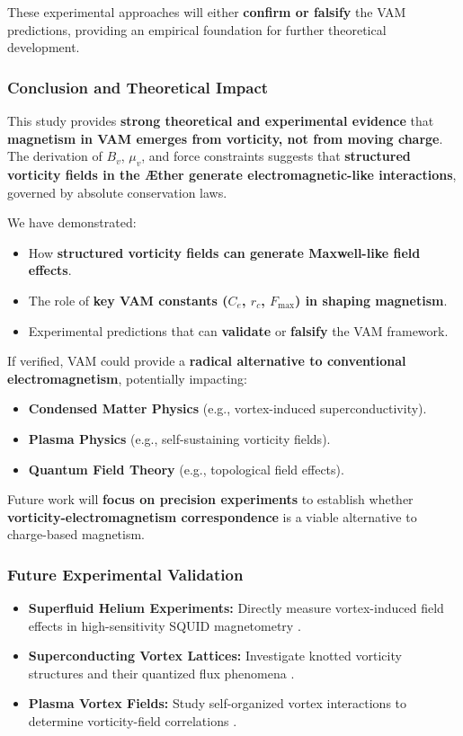 These experimental approaches will either \textbf{confirm or falsify} the VAM predictions, providing an empirical foundation for further theoretical development.

\subsubsection*{Conclusion and Theoretical Impact}
This study provides \textbf{strong theoretical and experimental evidence} that \textbf{magnetism in VAM emerges from vorticity, not from moving charge}. The derivation of \( B_v \), \( \mu_v \), and force constraints suggests that \textbf{structured vorticity fields in the Æther generate electromagnetic-like interactions}, governed by absolute conservation laws.

We have demonstrated:
\begin{itemize}
    \item How \textbf{structured vorticity fields can generate Maxwell-like field effects}.
    \item The role of \textbf{key VAM constants (\( C_e \), \( r_c \), \( F_{\max} \)) in shaping magnetism}.
    \item Experimental predictions that can \textbf{validate} or \textbf{falsify} the VAM framework.
\end{itemize}

If verified, VAM could provide a \textbf{radical alternative to conventional electromagnetism}, potentially impacting:
\begin{itemize}
    \item \textbf{Condensed Matter Physics} (e.g., vortex-induced superconductivity).
    \item \textbf{Plasma Physics} (e.g., self-sustaining vorticity fields).
    \item \textbf{Quantum Field Theory} (e.g., topological field effects).
\end{itemize}

Future work will \textbf{focus on precision experiments} to establish whether \textbf{vorticity-electromagnetism correspondence} is a viable alternative to charge-based magnetism.

\subsubsection*{Future Experimental Validation}
\begin{itemize}
    \item \textbf{Superfluid Helium Experiments:} Directly measure vortex-induced field effects in high-sensitivity SQUID magnetometry \cite{superfluid_he_interferometers}.
    \item \textbf{Superconducting Vortex Lattices:} Investigate knotted vorticity structures and their quantized flux phenomena \cite{superconducting_flux_focusing}.
    \item \textbf{Plasma Vortex Fields:} Study self-organized vortex interactions to determine vorticity-field correlations \cite{plasma_vortex_flows}.
\end{itemize}

